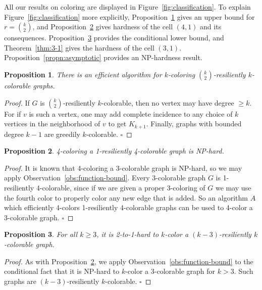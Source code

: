 \documentclass{llncs}
\newtheorem{propn}{Proposition}
\begin{document}
All our results on coloring are displayed in Figure~\ref{fig:classification}.
To explain Figure~\ref{fig:classification} more explicitly,
Proposition~\ref{propn:k-choose-2-bound} gives an upper bound for $r=
\binom{k}{2}$, and Proposition~\ref{propn:4-1} gives hardness of the cell
$(4,1)$ and its consequences. Proposition~\ref{propn:2-to-1-diagonal} provides
the conditional lower bound, and Theorem~\ref{thm:3-1} gives the hardness of
the cell $(3,1)$. Proposition~\ref{propn:asymptotic} provides an NP-hardness
result.

\begin{propn}\label{propn:k-choose-2-bound}
There is an efficient algorithm for $k$-coloring $\binom{k}{2}$-resiliently
$k$-colorable graphs.
\end{propn}
\begin{proof}
If $G$ is $\binom{k}{2}$-resiliently $k$-colorable, then no vertex may have
degree $ \geq k$. For if $v$ is such a vertex, one may add complete incidence to
any choice of $k$ vertices in the neighborhood of $v$ to get $K_{k+1}$. Finally,
graphs with bounded degree $k-1$ are greedily $k$-colorable. 
\hfill $\square$
\end{proof}

\begin{propn}\label{propn:4-1}
4-coloring a 1-resiliently 4-colorable graph is NP-hard.
\end{propn}
\begin{proof}
It is known that 4-coloring a 3-colorable graph is NP-hard, so we may apply
Observation~\ref{obs:function-bound}. Every 3-colorable graph $G$ is
1-resiliently 4-colorable, since if we are given a proper 3-coloring of $G$ we
may use the fourth color to properly color any new edge that is added. So an
algorithm $A$ which efficiently 4-colors 1-resiliently 4-colorable graphs can
be used to 4-color a 3-colorable graph.  \hfill $\square$
\end{proof}

\begin{propn}\label{propn:2-to-1-diagonal}
For all $k \geq 3$, it is 2-to-1-hard to $k$-color a $(k-3)$-resiliently
$k$-colorable graph. 
\end{propn}
\begin{proof}
As with Proposition~\ref{propn:4-1}, we apply
Observation~\ref{obs:function-bound} to the conditional fact that it is NP-hard
to $k$-color a 3-colorable graph for $k > 3$. Such graphs are
$(k-3)$-resiliently $k$-colorable.  \hfill $\square$
\end{proof}
\end{document}
